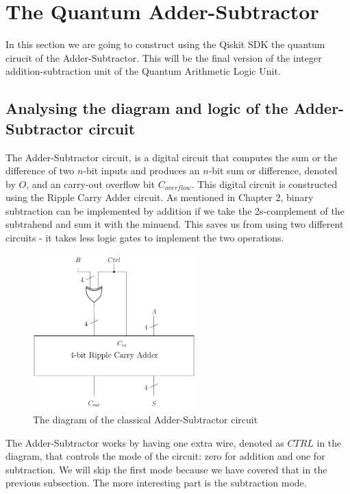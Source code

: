 \section{The Quantum Adder-Subtractor}

In this section we are going to construct using the Qiskit SDK the quantum cirucit of the Adder-Subtractor. This will
be the final version of the integer addition-subtraction unit of the Quantum Arithmetic Logic Unit.

\subsection{Analysing the diagram and logic of the Adder-Subtractor circuit}

The Adder-Subtractor circuit, is a digital circuit that computes the sum or the difference of two $n$-bit inputs
and produces an $n$-bit sum or difference, denoted by $O$, and an carry-out overflow bit $C_{overflow}$. This
digital circuit is constructed using the Ripple Carry Adder circuit. As mentioned in Chapter 2, binary subtraction
can be implemented by addition if we take the 2s-complement of the subtrahend and sum it with the minuend. This
saves us from using two different circuits - it takes less logic gates to implement the two operations.

\begin{figure}[!ht]
    \centering
    \includegraphics[height=6cm]{images/5_Implementation/classical_adder_subtractor.pdf}
    \caption{The diagram of the classical Adder-Subtractor circuit}
\end{figure}

The Adder-Subtractor works by having one extra wire, denoted as $CTRL$ in the diagram, that controls the mode
of the circuit: zero for addition and one for subtraction. We will skip the first mode because we have covered
that in the previous subsection. The more interesting part is the subtraction mode.

